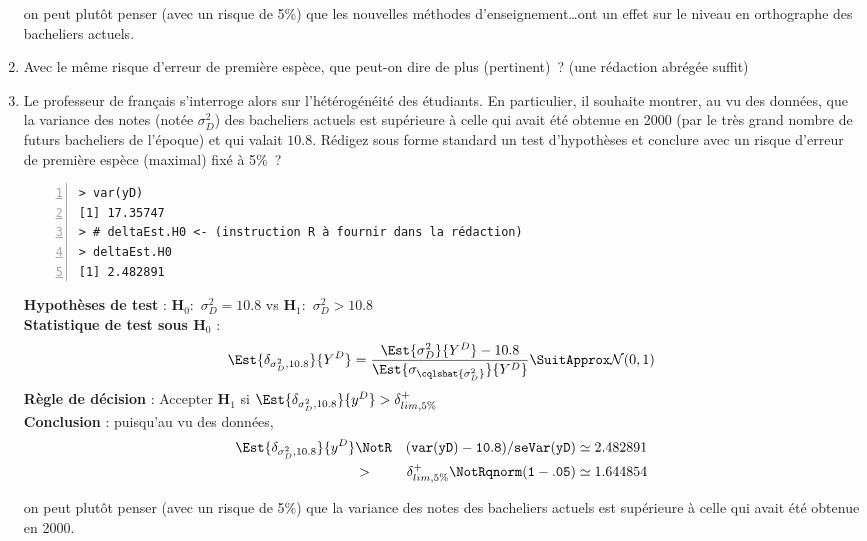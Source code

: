 \documentclass[10pt]{report}
\begin{document}
\begin{exercice}[Dictée]
\begin{enumerate}
\begin{Correction}
on peut plutôt penser (avec un risque de 5\%) que les nouvelles méthodes d'enseignement\ldots ont un effet sur le niveau en orthographe des bacheliers actuels.
\end{Correction}




\item Avec le même risque d'erreur de première espèce, que peut-on dire de plus (pertinent)~? (une rédaction abrégée suffit)

 


\item Le professeur de français s'interroge alors sur l'hétérogénéité des étudiants. En particulier, il souhaite montrer, au vu des données, que la variance des notes (notée $\sigma^2_D$) des bacheliers actuels est supérieure à celle qui avait été obtenue en 2000 (par le très grand nombre de futurs bacheliers de l'époque) et qui valait $10.8$. Rédigez sous forme standard un test d'hypothèses et conclure avec un risque d'erreur de première espèce (maximal) fixé à 5\%~? 


\IndicR
\begin{Verbatim}[frame=leftline,fontfamily=tt,fontshape=n,numbers=left]
> var(yD)
[1] 17.35747
> # deltaEst.H0 <- (instruction R à fournir dans la rédaction)
> deltaEst.H0
[1] 2.482891
\end{Verbatim}



\begin{Correction}

\noindent \textbf{Hypothèses de test} : $\mathbf{H}_0:$ $\sigma^2_{D}=10.8$ vs {\large $\mathbf{H}_1:$ $\sigma^2_{D}>10.8$}\\
\textbf{Statistique de test sous $\mathbf{H}_0$} :
  $$
  \Est{\delta_{\sigma^2_{D},10.8}}{Y^{D}}= {\displaystyle \frac{\Est{\sigma^2_{D}}{Y^{D}}-10.8}{
\Est{\sigma_{\cqlshat{\sigma^2_{D}}}}{Y^{D}}
}} 
  \SuitApprox \mathcal{N}(0,1)
  $$
\textbf{Règle de décision} : Accepter $\mathbf{H}_1$ si 
  $\Est{\delta_{\sigma^2_{D},10.8}}{y^{D}} > \delta^+_{lim,5\%}$\\
\noindent \textbf{Conclusion} :
puisqu'au vu des données, 
  \begin{eqnarray*}
\Est{\delta_{\sigma^2_{D},10.8}}{y^{D}} &\NotR&\mathtt{(var(yD)-10.8)/seVar(yD)}\simeq 2.482891\\& >  & \delta^+_{lim,5\%} \NotR \mathtt{qnorm(1-.05)}\simeq1.644854
\end{eqnarray*}
  
on peut plutôt penser (avec un risque de 5\%) que la variance des notes des bacheliers actuels est supérieure à celle qui avait été obtenue en 2000.
\end{Correction}




\end{enumerate}
\end{exercice}
\end{document}
